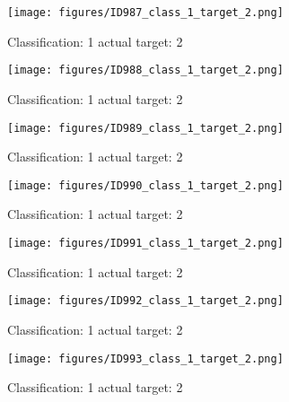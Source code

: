 \begin{figure}[h!]
\begin{center}
\texttt{[image: figures/ID987\_class\_1\_target\_2.png]}
\end{center}
\caption{ Classification: 1 actual target: 2}
\label{fig:ID987_class_1_target_2}
\end{figure}
\begin{figure}[h!]
\begin{center}
\texttt{[image: figures/ID988\_class\_1\_target\_2.png]}
\end{center}
\caption{ Classification: 1 actual target: 2}
\label{fig:ID988_class_1_target_2}
\end{figure}
\begin{figure}[h!]
\begin{center}
\texttt{[image: figures/ID989\_class\_1\_target\_2.png]}
\end{center}
\caption{ Classification: 1 actual target: 2}
\label{fig:ID989_class_1_target_2}
\end{figure}
\begin{figure}[h!]
\begin{center}
\texttt{[image: figures/ID990\_class\_1\_target\_2.png]}
\end{center}
\caption{ Classification: 1 actual target: 2}
\label{fig:ID990_class_1_target_2}
\end{figure}
\begin{figure}[h!]
\begin{center}
\texttt{[image: figures/ID991\_class\_1\_target\_2.png]}
\end{center}
\caption{ Classification: 1 actual target: 2}
\label{fig:ID991_class_1_target_2}
\end{figure}
\begin{figure}[h!]
\begin{center}
\texttt{[image: figures/ID992\_class\_1\_target\_2.png]}
\end{center}
\caption{ Classification: 1 actual target: 2}
\label{fig:ID992_class_1_target_2}
\end{figure}
\begin{figure}[h!]
\begin{center}
\texttt{[image: figures/ID993\_class\_1\_target\_2.png]}
\end{center}
\caption{ Classification: 1 actual target: 2}
\label{fig:ID993_class_1_target_2}
\end{figure}
